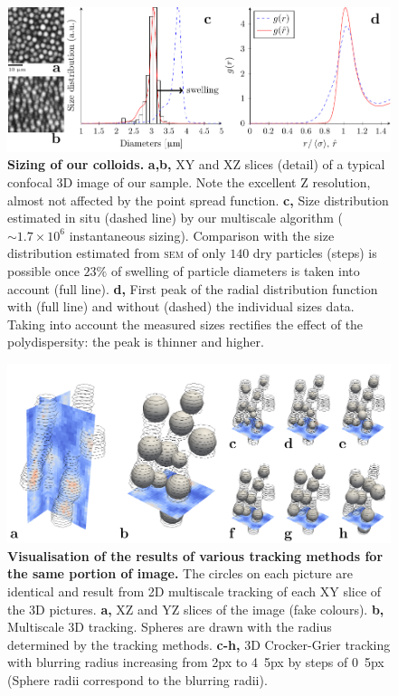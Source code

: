 \documentclass[reprint,notitlepage]{revtex4-1}
\begin{document}
\begin{figure}[!h]
\begin{center}
\includegraphics{fig_sizing.pdf}
\end{center}
	\caption{\textbf{Sizing of our colloids.} \textbf{a,b,} XY and XZ slices (detail) of a typical confocal 3D image of our sample. Note the excellent Z resolution, almost not affected by the point spread function. \textbf{c,} Size distribution estimated in situ (dashed line) by our multiscale algorithm ($\sim 1.7\times 10^6$ instantaneous sizing). Comparison with the size distribution estimated from \textsc{sem} of only $140$ dry particles (steps) is possible once $23\%$ of swelling of particle diameters is taken into account (full line). \textbf{d,} First peak of the radial distribution function with (full line) and without (dashed) the individual sizes data. Taking into account the measured sizes rectifies the effect of the polydispersity: the peak is thinner and higher.}
	\label{fig:sizing}
\end{figure}

\begin{figure}
\begin{center}
\includegraphics{fig_localise}
\end{center}
\caption{\textbf{Visualisation of the results of various tracking methods for the same portion of image.} The circles on each picture are identical and result from 2D multiscale tracking of each XY slice of the 3D pictures. \textbf{a,} XZ and YZ slices of the image (fake colours). \textbf{b,} Multiscale 3D tracking. Spheres are drawn with the radius determined by the tracking methods. \textbf{c-h,} 3D Crocker-Grier tracking with blurring radius increasing from \unit{2}{px} to \unit{4.5}{px} by steps of \unit{0.5}{px} (Sphere radii correspond to the blurring radii).}
	\label{fig:localise}
\end{figure}
\clearpage
\twocolumngrid
\end{document}

